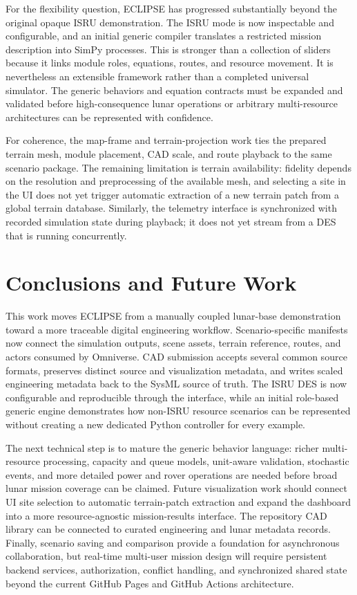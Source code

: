 For the flexibility question, ECLIPSE has progressed substantially beyond the original opaque ISRU demonstration. The ISRU mode is now inspectable and configurable, and an initial generic compiler translates a restricted mission description into SimPy processes. This is stronger than a collection of sliders because it links module roles, equations, routes, and resource movement. It is nevertheless an extensible framework rather than a completed universal simulator. The generic behaviors and equation contracts must be expanded and validated before high-consequence lunar operations or arbitrary multi-resource architectures can be represented with confidence.

For coherence, the map-frame and terrain-projection work ties the prepared terrain mesh, module placement, CAD scale, and route playback to the same scenario package. The remaining limitation is terrain availability: fidelity depends on the resolution and preprocessing of the available mesh, and selecting a site in the UI does not yet trigger automatic extraction of a new terrain patch from a global terrain database. Similarly, the telemetry interface is synchronized with recorded simulation state during playback; it does not yet stream from a DES that is running concurrently.

\section{Conclusions and Future Work}

This work moves ECLIPSE from a manually coupled lunar-base demonstration toward a more traceable digital engineering workflow. Scenario-specific manifests now connect the simulation outputs, scene assets, terrain reference, routes, and actors consumed by Omniverse. CAD submission accepts several common source formats, preserves distinct source and visualization metadata, and writes scaled engineering metadata back to the SysML source of truth. The ISRU DES is now configurable and reproducible through the interface, while an initial role-based generic engine demonstrates how non-ISRU resource scenarios can be represented without creating a new dedicated Python controller for every example.

The next technical step is to mature the generic behavior language: richer multi-resource processing, capacity and queue models, unit-aware validation, stochastic events, and more detailed power and rover operations are needed before broad lunar mission coverage can be claimed. Future visualization work should connect UI site selection to automatic terrain-patch extraction and expand the dashboard into a more resource-agnostic mission-results interface. The repository CAD library can be connected to curated engineering and lunar metadata records. Finally, scenario saving and comparison provide a foundation for asynchronous collaboration, but real-time multi-user mission design will require persistent backend services, authorization, conflict handling, and synchronized shared state beyond the current GitHub Pages and GitHub Actions architecture.

